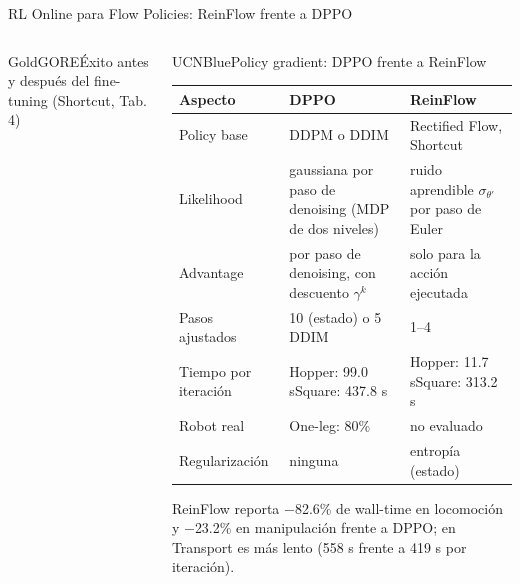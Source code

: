 \documentclass[aspectratio=169,10pt,xcolor={dvipsnames,table}]{beamer}
\newcommand{\CardHeightTall}{46mm}         %
\newcommand{\TabFont}{\fontsize{5.3}{6.4}\selectfont}                    %
\begin{document}
\begin{frame}{RL Online para Flow Policies: ReinFlow frente a DPPO}
\begin{columns}[T, onlytextwidth]
\begin{column}{0.50\textwidth}
\begin{Card}[height=\CardHeightTall]{GoldGORE}{Éxito antes y después del fine-tuning (Shortcut, Tab. 4)}
{\begin{itemize}
        \end{itemize}}
      \end{Card}
    \end{column}
    \begin{column}{0.48\textwidth}
      \begin{Card}[height=\CardHeightTall]{UCNBlue}{Policy gradient: DPPO frente a ReinFlow}
        {\TabFont
        \setlength{\tabcolsep}{1.4pt}
        \renewcommand{\arraystretch}{1.05}
        \begin{tabular}{@{}L{15mm} L{24mm} L{25mm}@{}}
          \toprule
          \textbf{Aspecto} & \textbf{DPPO} & \textbf{ReinFlow} \\
          \midrule
          Policy base & DDPM o DDIM & Rectified Flow, Shortcut \\
          Likelihood & gaussiana por paso de denoising (MDP de dos niveles) & ruido aprendible $\sigma_{\theta'}$ por paso de Euler \\
          Advantage & por paso de denoising, con descuento $\gamma^{k}$ & solo para la acción ejecutada \\
          Pasos ajustados & 10 (estado) o 5 DDIM & 1--4 \\
          Tiempo por iteración & Hopper: 99.0 s\newline Square: 437.8 s & Hopper: 11.7 s\newline Square: 313.2 s \\
          Robot real & One-leg: 80\% & no evaluado \\
          Regularización & ninguna & entropía (estado) \\
          \bottomrule
        \end{tabular}\par
        \vspace{1mm}
        \textcolor{TextDark!80}{ReinFlow reporta $-$82.6\% de wall-time en locomoción y $-$23.2\% en manipulación frente a DPPO; en Transport es más lento (558 s frente a 419 s por iteración).}\par}
      \end{Card}
    \end{column}
  \end{columns}
\end{frame}
\end{document}
